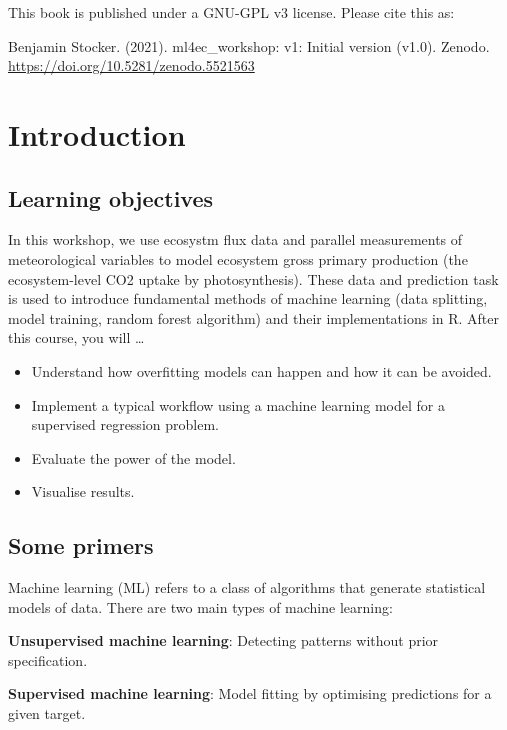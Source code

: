 \documentclass[
]{book}
\providecommand{\tightlist}{%
  \setlength{\itemsep}{0pt}\setlength{\parskip}{0pt}}
\begin{document}
This book is published under a GNU-GPL v3 license. Please cite this as:

Benjamin Stocker. (2021). ml4ec\_workshop: v1: Initial version (v1.0). Zenodo. \url{https://doi.org/10.5281/zenodo.5521563}

\hypertarget{introduction}{%
\chapter{Introduction}\label{introduction}}

\hypertarget{learning-objectives}{%
\section{Learning objectives}\label{learning-objectives}}

In this workshop, we use ecosystm flux data and parallel measurements of meteorological variables to model ecosystem gross primary production (the ecosystem-level CO2 uptake by photosynthesis). These data and prediction task is used to introduce fundamental methods of machine learning (data splitting, model training, random forest algorithm) and their implementations in R. After this course, you will \ldots{}

\begin{itemize}
\tightlist
\item
  Understand how overfitting models can happen and how it can be avoided.
\item
  Implement a typical workflow using a machine learning model for a supervised regression problem.
\item
  Evaluate the power of the model.
\item
  Visualise results.
\end{itemize}

\hypertarget{some-primers}{%
\section{Some primers}\label{some-primers}}

Machine learning (ML) refers to a class of algorithms that generate statistical models of data. There are two main types of machine learning:

\textbf{Unsupervised machine learning}: Detecting patterns without prior specification.

\textbf{Supervised machine learning}: Model fitting by optimising predictions for a given target.
\end{document}
